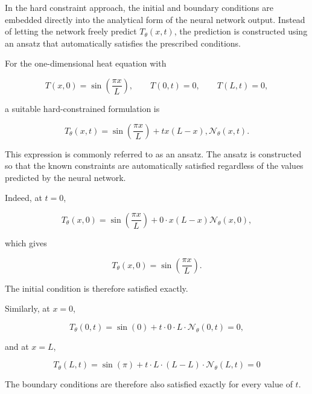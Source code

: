 In the hard constraint approach, the initial and boundary conditions are embedded directly into the analytical form of the neural network output. Instead of letting the network freely predict $T_{\theta}(x,t)$, the prediction is constructed using an ansatz that automatically satisfies the prescribed conditions.

For the one-dimensional heat equation with

\begin{equation}
T(x,0) = \sin\left(\frac{\pi x}{L}\right),
\qquad
T(0,t)=0,
\qquad
T(L,t)=0,
\end{equation}

a suitable hard-constrained formulation is

\begin{equation}
T_{\theta}(x,t) =\sin\left(\frac{\pi x}{L}\right)
+
tx(L-x),\mathcal{N}_{\theta}(x,t).
\end{equation}

This expression is commonly referred to as an ansatz. The ansatz is constructed so that the known constraints are automatically satisfied regardless of the values predicted by the neural network.

Indeed, at $t=0$,

\begin{equation}
T_{\theta}(x,0) = \sin\left(\frac{\pi x}{L}\right)
+
0 \cdot x(L-x)\mathcal{N}_{\theta}(x,0),
\end{equation}

which gives

\begin{equation}
T_{\theta}(x,0) = 
\sin\left(\frac{\pi x}{L}\right).
\end{equation}

The initial condition is therefore satisfied exactly.

Similarly, at $x=0$,

\begin{equation}
T_{\theta}(0,t) = \sin(0)
+
t \cdot 0 \cdot L \cdot \mathcal{N}_{\theta}(0,t) = 0,
\end{equation}

and at $x=L$,

\begin{equation}
T_{\theta}(L,t) = \sin(\pi) + t \cdot L \cdot (L-L) \cdot \mathcal{N}_{\theta}(L,t) = 0
\end{equation}

The boundary conditions are therefore also satisfied exactly for every value of $t$.

